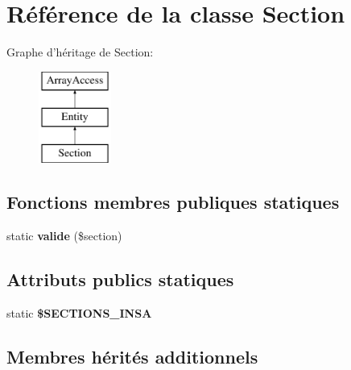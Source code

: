 \hypertarget{class_library_1_1_entities_1_1_section}{\section{Référence de la classe Section}
\label{class_library_1_1_entities_1_1_section}
}
Graphe d'héritage de Section\+:\begin{figure}[H]
\begin{center}
\leavevmode
\includegraphics[height=3.000000cm]{class_library_1_1_entities_1_1_section}
\end{center}
\end{figure}
\subsection*{Fonctions membres publiques statiques}
\begin{DoxyCompactItemize}
\item 
\hypertarget{class_library_1_1_entities_1_1_section_ad4c503966cbc793afb2ca41f8d17095f}{static {\bfseries valide} (\$section)}\label{class_library_1_1_entities_1_1_section_ad4c503966cbc793afb2ca41f8d17095f}

\end{DoxyCompactItemize}
\subsection*{Attributs publics statiques}
\begin{DoxyCompactItemize}
\item 
static {\bfseries \$\+S\+E\+C\+T\+I\+O\+N\+S\+\_\+\+I\+N\+S\+A}
\end{DoxyCompactItemize}
\subsection*{Membres hérités additionnels}


